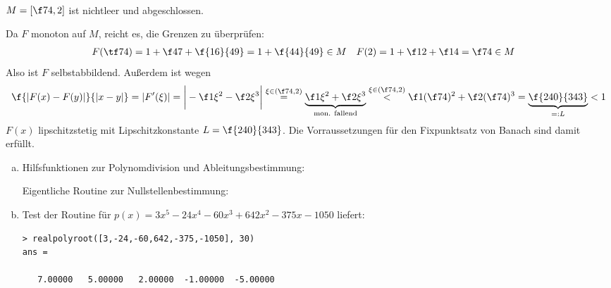 \documentclass[a4paper]{scrartcl}
\begin{document}
\begin{aufgabe}~

	$M = [\f 74, 2]$ ist nichtleer und abgeschlossen.

	Da $F$ monoton auf $M$, reicht es, die Grenzen zu überprüfen:
	\begin{align*}
		F(\tf 74) &= 1 + \f 47 + \f {16}{49} = 1 + \f {44}{49} \in M &
		F(2) &= 1 + \f 12 + \f 14 = \f 74 \in M
	\end{align*}
	Also ist $F$ selbstabbildend.
	Außerdem ist wegen
	\[
		\f {|F(x) - F(y)|}{|x-y|} 
		= |F'(\xi)| 
		= \bigg| - \f 1{\xi^2} - \f 2{\xi^3} \bigg| \stackrel{\xi \in (\f 74, 2)}
		= \underbrace{\f 1{\xi^2} + \f 2{\xi^3} }_{\text{mon. fallend}} 
		\stackrel{\xi \in (\f 74, 2)}< \f 1{(\f 74)^2} + \f 2{(\f 74)^3} 
		= \underbrace{\f {240}{343}}_{=:L} < 1
	\]
	$F(x)$ lipschitzstetig mit Lipschitzkonstante $L = \f {240}{343}$.
	Die Vorraussetzungen für den Fixpunktsatz von Banach sind damit erfüllt.
\end{aufgabe}

\newpage 

\begin{aufgabe}
	
	\begin{enumerate}[a)]
		\item
			Hilfsfunktionen zur Polynomdivision und Ableitungsbestimmung:
			
			
			Eigentliche Routine zur Nullstellenbestimmung:
			
		\item
			Test der Routine für $p(x) = 3x^5 - 24x^4 - 60x^3 + 642x^2 - 375x - 1050$ liefert:
			\begin{verbatim}
> realpolyroot([3,-24,-60,642,-375,-1050], 30)
ans =

   7.00000   5.00000   2.00000  -1.00000  -5.00000
			\end{verbatim}
	\end{enumerate}
\end{aufgabe}
\end{document}
